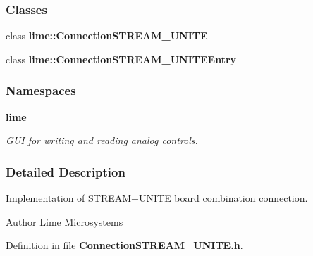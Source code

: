 \subsubsection*{Classes}
\begin{DoxyCompactItemize}
\item 
class {\bf lime\+::\+Connection\+S\+T\+R\+E\+A\+M\+\_\+\+U\+N\+I\+TE}
\item 
class {\bf lime\+::\+Connection\+S\+T\+R\+E\+A\+M\+\_\+\+U\+N\+I\+T\+E\+Entry}
\end{DoxyCompactItemize}
\subsubsection*{Namespaces}
\begin{DoxyCompactItemize}
\item 
 {\bf lime}
\begin{DoxyCompactList}\small\item\em G\+UI for writing and reading analog controls. \end{DoxyCompactList}\end{DoxyCompactItemize}


\subsubsection{Detailed Description}
Implementation of S\+T\+R\+E\+A\+M+\+U\+N\+I\+TE board combination connection. 

\begin{DoxyAuthor}{Author}
Lime Microsystems 
\end{DoxyAuthor}


Definition in file {\bf Connection\+S\+T\+R\+E\+A\+M\+\_\+\+U\+N\+I\+T\+E.\+h}.

